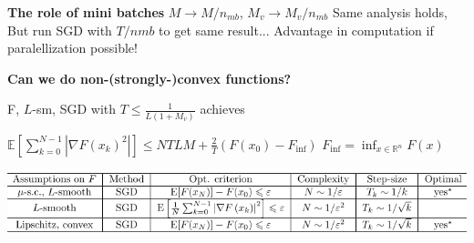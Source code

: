 \textbf{The role of mini batches}
$M\rightarrow{M/n_{mb}}$, $M_v \rightarrow{M_v/n_{mb}}$
Same analysis holds,
But run SGD with $T/n{mb}$ to get same result...
Advantage in computation if paralellization possible!

\textbf{Can we do non-(strongly-)convex functions? }

\begin{proposition}
	F, $L$-sm, SGD with
	$T\le \frac{1}{L(1+M_v)}$ achieves

	$\mathbb{E}[\sum_{k=0}^{N-1}|\nabla F(x_k)^2|]
		\le NTLM + \frac{2}{T}(F(x_0)-F_\text{inf})$
	$F_\text{inf} = \operatorname{inf}_{x\in\mathbb{R}^n}F(x)$
\end{proposition}

\includegraphics[width=\columnwidth]{images/sgd-table.png}
